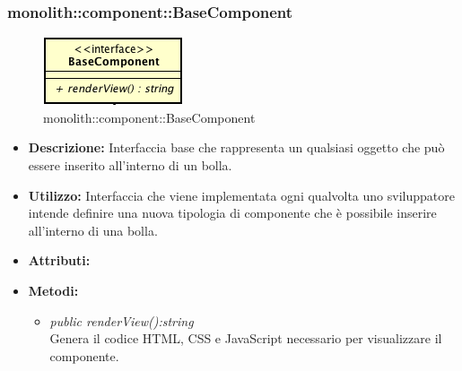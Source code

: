 \subsubsection{monolith::component::BaseComponent}

\label{monolith::component::BaseComponent}
\begin{figure}[H]
	\centering
	\includegraphics[scale=0.5]{Sezioni/SottosezioniST/img/BaseComponent.png}
	\caption{monolith::component::BaseComponent}
\end{figure}

\begin{itemize}
\item \textbf{Descrizione:} Interfaccia base che rappresenta un qualsiasi oggetto che può essere inserito all'interno di un bolla.
\item \textbf{Utilizzo:} Interfaccia che viene implementata ogni qualvolta uno sviluppatore intende definire una nuova tipologia di componente che è possibile inserire all'interno di una bolla.
\item \textbf{Attributi:}
\item \textbf{Metodi:}
\begin{itemize}
\item \textit{public renderView():string}\\
Genera il codice HTML, CSS e JavaScript necessario per visualizzare il componente.
\end{itemize}
\end{itemize}
